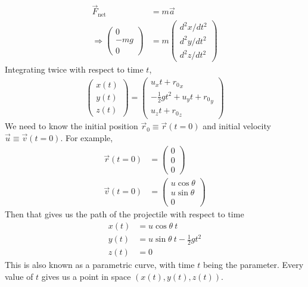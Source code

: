 \documentclass{article}
\begin{document}
\begin{align}
\vec{F}_{\text{net}} &= m \vec{a} \\
\Rightarrow \left(
    \begin{array}{c}  
         0 \\
         -mg \\
         0
    \end{array} 
    \right) &= m \left(
    \begin{array}{c}  
         d^2x/dt^2 \\
         d^2y/dt^2 \\
         d^2z/dt^2
    \end{array} 
    \right)
\end{align}
Integrating twice with respect to time $t$,
\begin{align}
    \left(
    \begin{array}{c}  
         x(t) \\
         y(t) \\
         z(t)
    \end{array} 
    \right) = \left(
    \begin{array}{c}  
          {u}_x t + {r_0}_x\\
         -\frac{1}{2}gt^2 + {u}_y t + {r_0}_y\\
          {u}_z t + {r_0}_z
    \end{array} 
    \right)
\end{align}
We need to know the initial position $\vec{r}_0 \equiv \vec{r}(t=0)$ and initial velocity $\vec{u} \equiv \vec{v}(t=0)$. For example, 
\begin{align}
    \vec{r}(t=0) &= \left(
    \begin{array}{c}  
         0 \\
         0 \\
         0
    \end{array} 
    \right) \\
    \vec{v}(t=0) &= \left(
    \begin{array}{c}  
         u \cos \theta \\
         u \sin \theta \\
         0
    \end{array} 
    \right)
\end{align}   
Then that gives us the path of the projectile with respect to time
\begin{align}
    x(t) &= u \cos \theta\ t \label{eq:xt} \\
    y(t) &= u \sin \theta\ t - \frac{1}{2} gt^2 \\
    z(t) &= 0
\end{align}
This is also known as a parametric curve, with time $t$ being the parameter. Every value of $t$ gives us a point in space $(x(t),y(t),z(t))$. 
\end{document}
